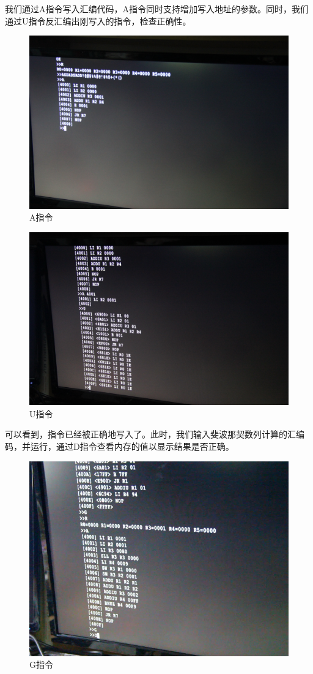 我们通过A指令写入汇编代码，A指令同时支持增加写入地址的参数。同时，我们通过U指令反汇编出刚写入的指令，检查正确性。

\begin{figure}[H]
  \centering
  \includegraphics[width=4.5in]{Figures/picture/IMG_7235.JPG}
  \caption{A指令}
\end{figure}

\begin{figure}[H]
  \centering
  \includegraphics[width=4.5in]{Figures/picture/IMG_7236.JPG}
  \caption{U指令}
\end{figure}

可以看到，指令已经被正确地写入了。此时，我们输入斐波那契数列计算的汇编码，并运行，通过D指令查看内存的值以显示结果是否正确。

\begin{figure}[H]
  \centering
  \includegraphics[width=4.5in]{Figures/picture/vlcsnap-2015-12-09-23h47m55s801.png}
  \caption{G指令}
\end{figure}

